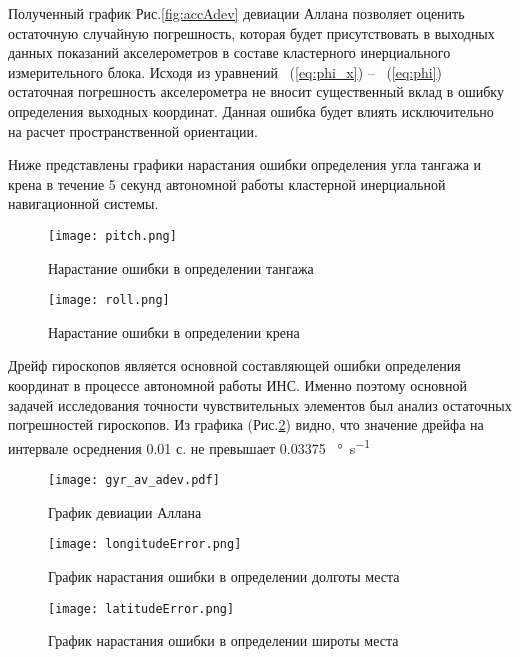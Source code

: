 Полученный график Рис.\ref{fig:accAdev} девиации Аллана позволяет оценить остаточную случайную погрешность, которая будет присутствовать в выходных данных показаний акселерометров в составе кластерного инерциального измерительного блока. Исходя из уравнений ~(\ref{eq:phi_x}) -- ~(\ref{eq:phi}) остаточная погрешность акселерометра не вносит существенный вклад в ошибку определения выходных координат. Данная ошибка будет влиять исключительно на расчет пространственной ориентации.  


Ниже представлены графики нарастания ошибки определения угла тангажа и крена в течение 5 секунд автономной работы кластерной инерциальной навигационной системы. 

\newpage

\begin{figure}[h!]
	\centering
	\texttt{[image: pitch.png]}
	\caption{Нарастание ошибки в определении тангажа}
	\label{fig:pitch}
	
	\vspace*{\floatsep}
	
	\texttt{[image: roll.png]}
	\caption{Нарастание ошибки в определении крена}
	\label{fig:roll}
	
\end{figure}

\newpage
Дрейф гироскопов является основной составляющей ошибки определения координат в процессе автономной работы ИНС. Именно поэтому основной задачей исследования точности чувствительных элементов был анализ остаточных погрешностей гироскопов. Из графика (Рис.\ref{fig:mpr}) видно, что значение дрейфа на интервале осреднения 0.01 с. не превышает 0.03375 \SI[per-mode=symbol]{}{\degree\per\second}


\begin{figure}[h!]
	\centering
	\texttt{[image: gyr\_av\_adev.pdf]}
	\caption{График девиации Аллана}
	\label{fig:mpr}
\end{figure}

\newpage

\begin{figure}[h!]
	
	\centering
	\texttt{[image: longitudeError.png]}
	\caption{График нарастания ошибки в определении долготы места}
	\label{fig:long_error}

	\vspace*{\floatsep}
	
	\texttt{[image: latitudeError.png]}
	\caption{График нарастания ошибки в определении широты места}
	\label{fig:lat_error}
\end{figure}
\newpage
